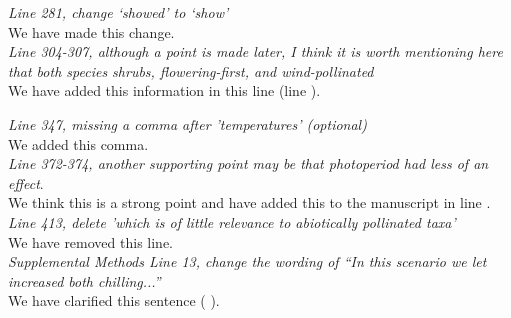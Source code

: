 \documentclass[11pt]{article}
\begin{document}
\emph{Line 281, change `showed' to `show'}\\

\noindent We have made this change.\\

\emph{Line 304-307, although a point is made later, I think it is worth mentioning here that both species shrubs, flowering-first, and wind-pollinated}\\

\noindent We have added this information in this line (line ).

\emph{Line 347, missing a comma after 'temperatures' (optional)}\\

\noindent We added this comma.\\

\emph{Line 372-374, another supporting point may be that photoperiod had less of an effect}.\\

\noindent We think this is a strong point and have added this to the manuscript in line  .\\


\emph{Line 413, delete 'which is of little relevance to abiotically pollinated taxa'}\\

\noindent We have removed this line.\\

\emph{Supplemental Methods Line 13, change the wording of ``In this scenario we let increased both chilling...''}\\

\noindent We have clarified this sentence ( ). \\

 
\end{document}
